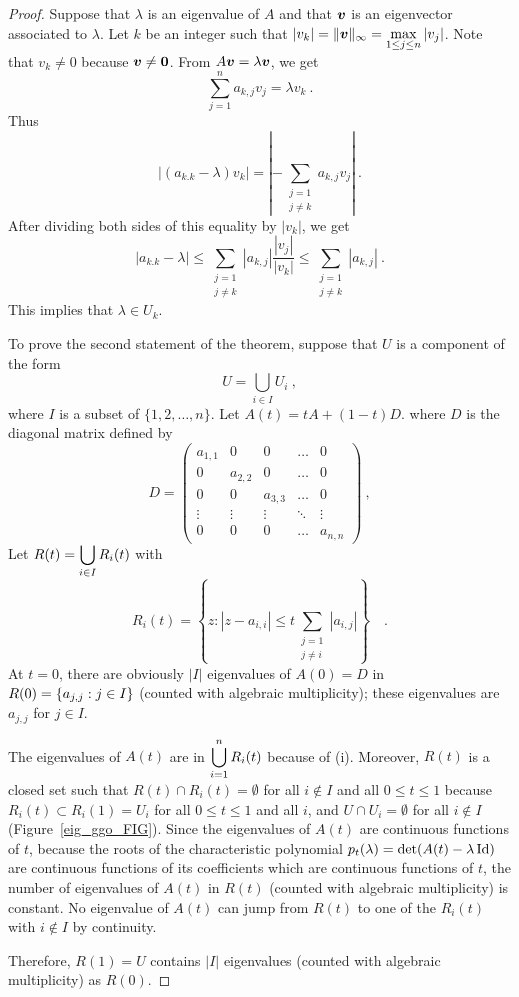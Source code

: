 \begin{proof}
 Suppose that $\lambda$ is an eigenvalue of $A$ and that $\bm{v}$ is
an eigenvector associated to $\lambda$.  Let $k$ be an integer such that
$\displaystyle |v_k| = \|\bm{v}\|_\infty = \max_{1\leq j\leq n} |v_j|$.
Note that $v_k \neq 0$ because $\bm{v} \neq \bm{0}$.  From
$A\bm{v} = \lambda \bm{v}$, we get
\[
\sum_{j=1}^n a_{k,j} v_j = \lambda v_k \ .
\]
Thus
\[
\left| (a_{k.k} - \lambda ) v_k \right|
= \left| - \sum_{\substack{j=1\\ j\neq k}} a_{k,j} v_j \right| \  .
\]
After dividing both sides of this equality by $|v_k|$, we get
\[
\left| a_{k.k} - \lambda \right|
\leq \sum_{\substack{j=1\\ j\neq k}} \left|a_{k,j} \right|
\frac{|v_j|}{|v_k|} \leq \sum_{\substack{j=1\\ j\neq k}} \left|a_{k,j} \right| \ .
\]
This implies that $\lambda \in U_k$.

 To prove the second statement of the theorem, suppose that $U$ is a
component of the form
\[
U = \bigcup_{i\in I} U_i \  ,
\]
where $I$ is a subset of $\{1,2,\ldots,n\}$.  Let
$A(t) = tA + (1-t)D$. where $D$ is the diagonal matrix defined by
\[
D =
\begin{pmatrix}
a_{1,1} & 0 & 0 & \ldots & 0 \\
0 & a_{2,2} & 0 & \ldots & 0 \\
0 & 0 & a_{3,3} & \ldots & 0 \\
\vdots & \vdots & \vdots & \ddots & \vdots \\
0 & 0 & 0 & \ldots & a_{n,n} 
\end{pmatrix} \ ,
\]
Let $\displaystyle R(t) = \bigcup_{i\in I} R_i(t)$ with
\[
R_i(t) = \left\{ z : |z-a_{i,i}| \leq t \sum_{\substack{j=1\\ j\neq i}}
| a_{i,j} | \right\} \quad .
\]
At $t=0$, there are obviously $|I|$ eigenvalues of $A(0) = D$ in
$\displaystyle R(0) = \left\{ a_{j,j} : j \in I \right\}$
(counted with algebraic multiplicity); these eigenvalues are $a_{j,j}$ for
$j\in I$.

The eigenvalues of $A(t)$ are in $\displaystyle \bigcup_{i=1}^n R_i(t)$
because of (i). Moreover, $R(t)$ is a closed set such that
$R(t) \cap R_i(t) = \emptyset$ for all $i\not\in I$ and all
$0\leq t \leq 1$ because $ R_i(t) \subset R_i(1) = U_i$ for all
$0\leq t \leq 1$ and all $i$, and $U \cap U_i = \emptyset$ for all
$i\not\in I$ (Figure~\ref{eig_ggo_FIG}).
Since the eigenvalues of $A(t)$ are continuous functions of $t$, because the
roots of the characteristic polynomial
$p_t(\lambda) = \det(A(t) - \lambda \operatorname{Id})$
are continuous functions of its coefficients which are continuous functions
of $t$, the number of eigenvalues of $A(t)$ in $R(t)$ (counted with
algebraic multiplicity) is constant.  No eigenvalue of $A(t)$ can jump from
$R(t)$ to one of the $R_i(t)$ with $i\not\in I$ by continuity.

Therefore, $R(1)=U$ contains $|I|$ eigenvalues (counted with algebraic
multiplicity) as $R(0)$.
\end{proof}

